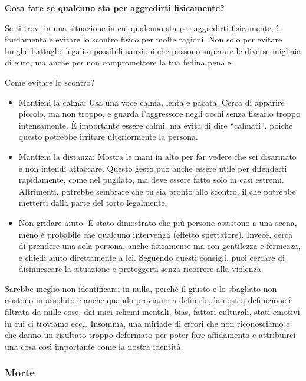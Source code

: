 \documentclass[12pt]{book} %
\begin{document}
\begin{mdframed}[linewidth=1pt]
\textbf{Cosa fare se qualcuno sta per aggredirti fisicamente?}

Se ti trovi in una situazione in cui qualcuno sta per aggredirti fisicamente, è fondamentale evitare lo scontro fisico per molte ragioni. Non solo per evitare lunghe battaglie legali e possibili sanzioni che possono superare le diverse migliaia di euro, ma anche per non compromettere la tua fedina penale.

Come evitare lo scontro?
\begin{itemize}
\item Mantieni la calma: Usa una voce calma, lenta e pacata. Cerca di apparire piccolo, ma non troppo, e guarda l’aggressore negli occhi senza fissarlo troppo intensamente. È importante essere calmi, ma evita di dire “calmati”, poiché questo potrebbe irritare ulteriormente la persona.
\item Mantieni la distanza: Mostra le mani in alto per far vedere che sei disarmato e non intendi attaccare. Questo gesto può anche essere utile per difenderti rapidamente, come nel pugilato, ma deve essere fatto solo in casi estremi. Altrimenti, potrebbe sembrare che tu sia pronto allo scontro, il che potrebbe metterti dalla parte del torto legalmente.
\item Non gridare aiuto: È stato dimostrato che più persone assistono a una scena, meno è probabile che qualcuno intervenga (effetto spettatore). Invece, cerca di prendere una sola persona, anche fisicamente ma con gentilezza e fermezza, e chiedi aiuto direttamente a lei.
Seguendo questi consigli, puoi cercare di disinnescare la situazione e proteggerti senza ricorrere alla violenza.
\end{itemize}
\end{mdframed}

Sarebbe meglio non identificarsi in nulla, perché il giusto e lo sbagliato non esistono in assoluto e anche quando
proviamo a definirlo, la nostra definizione è filtrata da mille cose, dai miei schemi mentali,
bias, fattori culturali, stati emotivi in cui ci troviamo ecc… Insomma, una miriade di errori che non riconosciamo e che
danno un risultato troppo deformato per poter fare affidamento e attribuirci una cosa così importante come la nostra identità.

\subsubsection{Morte}
\end{document}
